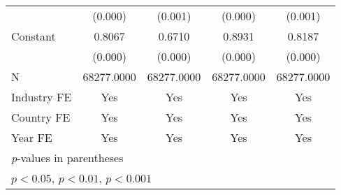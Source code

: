 {\begin{tabular}{l*{4}{c}}
                    &     (0.000)         &     (0.001)         &     (0.000)         &     (0.001)         \\
Constant            &      0.8067\sym{***}&      0.6710\sym{***}&      0.8931\sym{***}&      0.8187\sym{***}\\
                    &     (0.000)         &     (0.000)         &     (0.000)         &     (0.000)         \\
\hline
N                   &  68277.0000         &  68277.0000         &  68277.0000         &  68277.0000         \\
Industry FE         &         Yes         &         Yes         &         Yes         &         Yes         \\
Country FE          &         Yes         &         Yes         &         Yes         &         Yes         \\
Year FE             &         Yes         &         Yes         &         Yes         &         Yes         \\
\hline\hline
\multicolumn{5}{l}{\footnotesize \textit{p}-values in parentheses}\\
\multicolumn{5}{l}{\footnotesize \sym{*} \(p<0.05\), \sym{**} \(p<0.01\), \sym{***} \(p<0.001\)}\\
\end{tabular}
}
